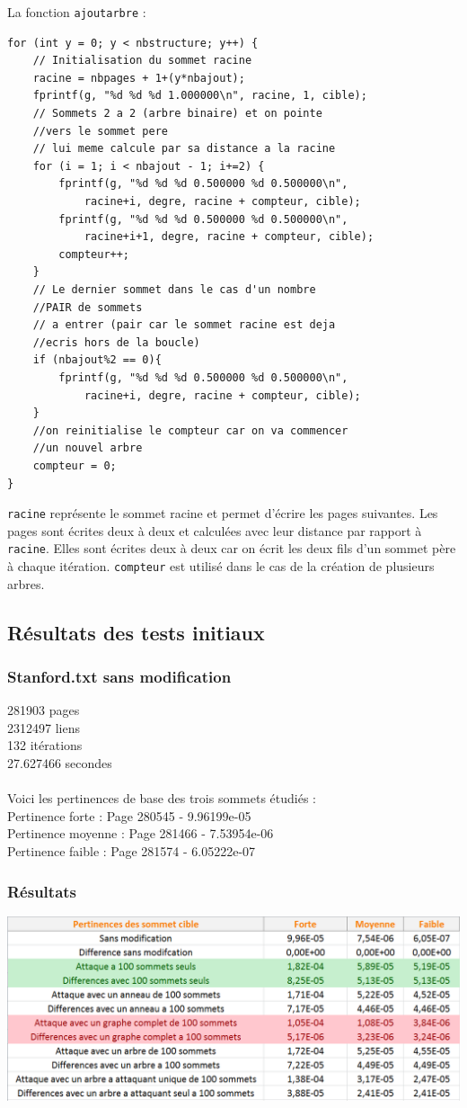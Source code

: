 \documentclass[a4paper,11pt]{article}
\begin{document}
	La fonction \texttt{ajoutarbre} :
	\begin{lstlisting}
for (int y = 0; y < nbstructure; y++) {
	// Initialisation du sommet racine
	racine = nbpages + 1+(y*nbajout);
	fprintf(g, "%d %d %d 1.000000\n", racine, 1, cible);
	// Sommets 2 a 2 (arbre binaire) et on pointe 
	//vers le sommet pere 
	// lui meme calcule par sa distance a la racine	
	for (i = 1; i < nbajout - 1; i+=2) {
		fprintf(g, "%d %d %d 0.500000 %d 0.500000\n", 
			racine+i, degre, racine + compteur, cible);	
		fprintf(g, "%d %d %d 0.500000 %d 0.500000\n", 
			racine+i+1, degre, racine + compteur, cible);	
		compteur++;
	}
	// Le dernier sommet dans le cas d'un nombre 
	//PAIR de sommets 
	// a entrer (pair car le sommet racine est deja 
	//ecris hors de la boucle)
	if (nbajout%2 == 0){ 
		fprintf(g, "%d %d %d 0.500000 %d 0.500000\n", 
			racine+i, degre, racine + compteur, cible);
	}
	//on reinitialise le compteur car on va commencer
	//un nouvel arbre
	compteur = 0;
}
	\end{lstlisting}
	\texttt{racine} représente le sommet racine et permet d'écrire les pages suivantes. Les pages sont écrites deux à deux et calculées avec leur distance par rapport à \texttt{racine}. Elles sont écrites deux à deux car on écrit les deux fils d'un sommet père à chaque itération. \texttt{compteur} est utilisé dans le cas de la création de plusieurs arbres.

	\subsection{Résultats des tests initiaux}
		\subsubsection{Stanford.txt sans modification}
			281903 pages\\
			2312497 liens\\
			132 itérations\\
			27.627466 secondes\\
			\\
			Voici les pertinences de base des trois sommets étudiés :\\
			Pertinence forte : Page 280545 - 9.96199e-05\\
			Pertinence moyenne : Page 281466 - 7.53954e-06\\
			Pertinence faible : Page 281574 - 6.05222e-07
		\subsubsection{Résultats}
			\includegraphics[scale = 0.5]{Captures/ranking1.PNG}
\end{document}
